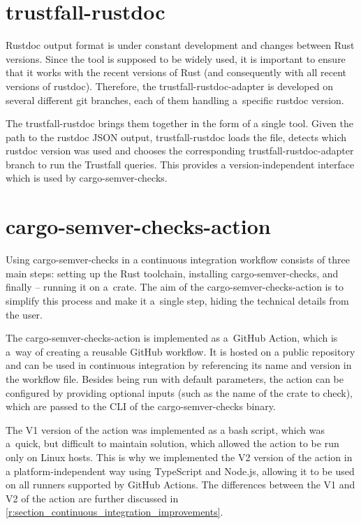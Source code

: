 \documentclass[licencjacka,en]{pracamgr}
\begin{document}
\section{trustfall-rustdoc}

Rustdoc output format is under constant development and changes between Rust versions. Since
the tool is supposed to be widely used, it is important to ensure that it
works with the recent versions of Rust (and consequently with all recent versions of
rustdoc). Therefore, the trustfall-rustdoc-adapter is developed on several different git
branches, each of them handling a~specific rustdoc version.

The trustfall-rustdoc brings them together in the form of a single tool. Given the path to the rustdoc JSON
output, trustfall-rustdoc loads the file, detects which rustdoc version was used and chooses the
corresponding trustfall-rustdoc-adapter branch to run the Trustfall queries.
This provides a version-independent interface which is used by cargo-semver-checks.

\section{cargo-semver-checks-action}

Using cargo-semver-checks in a continuous integration workflow consists of three main steps: setting up the Rust toolchain,
installing cargo-semver-checks, and finally -- running it on a~crate. The aim of the cargo-semver-checks-action is to simplify
this process and make it a~single step, hiding the technical details from the user.

The cargo-semver-checks-action is implemented as a~GitHub Action, which is a~way of creating a reusable GitHub workflow.
It is hosted on a public repository and can be used in continuous integration by referencing its name and version
in the workflow file. Besides being run with default parameters, the action can be configured by providing optional inputs
(such as the name of the crate to check), which are passed to the CLI of the cargo-semver-checks binary.

The V1 version of the action was implemented as a bash script, which was a~quick, but difficult to maintain solution,
which allowed the action to be run only on Linux hosts. This is why we implemented the V2 version of the action in a platform-independent way
using TypeScript and Node.js, allowing it to be used on all runners supported by GitHub Actions. The differences
between the V1 and V2 of the action are further discussed in \ref{r:section_continuous_integration_improvements}.
\end{document}
